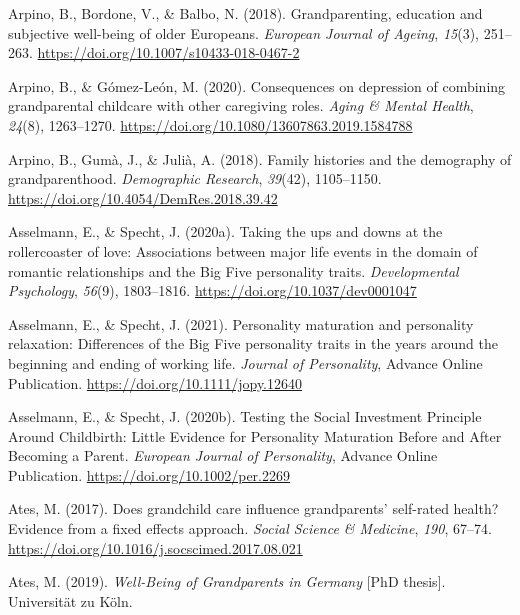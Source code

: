\documentclass[
  english,
  man,floatsintext]{apa7}
\begin{document}
\leavevmode\hypertarget{ref-arpinoGrandparentingEducationSubjective2018}{}%
Arpino, B., Bordone, V., \& Balbo, N. (2018). Grandparenting, education and subjective well-being of older Europeans. \emph{European Journal of Ageing}, \emph{15}(3), 251--263. \url{https://doi.org/10.1007/s10433-018-0467-2}

\leavevmode\hypertarget{ref-arpinoConsequencesDepressionCombining2020}{}%
Arpino, B., \& Gómez-León, M. (2020). Consequences on depression of combining grandparental childcare with other caregiving roles. \emph{Aging \& Mental Health}, \emph{24}(8), 1263--1270. \url{https://doi.org/10.1080/13607863.2019.1584788}

\leavevmode\hypertarget{ref-arpinoFamilyHistoriesDemography2018}{}%
Arpino, B., Gumà, J., \& Julià, A. (2018). Family histories and the demography of grandparenthood. \emph{Demographic Research}, \emph{39}(42), 1105--1150. \url{https://doi.org/10.4054/DemRes.2018.39.42}

\leavevmode\hypertarget{ref-asselmannTakingUpsDowns2020}{}%
Asselmann, E., \& Specht, J. (2020a). Taking the ups and downs at the rollercoaster of love: Associations between major life events in the domain of romantic relationships and the Big Five personality traits. \emph{Developmental Psychology}, \emph{56}(9), 1803--1816. \url{https://doi.org/10.1037/dev0001047}

\leavevmode\hypertarget{ref-asselmannPersonalityMaturationPersonality2021}{}%
Asselmann, E., \& Specht, J. (2021). Personality maturation and personality relaxation: Differences of the Big Five personality traits in the years around the beginning and ending of working life. \emph{Journal of Personality}, Advance Online Publication. \url{https://doi.org/10.1111/jopy.12640}

\leavevmode\hypertarget{ref-asselmannTestingSocialInvestment2020}{}%
Asselmann, E., \& Specht, J. (2020b). Testing the Social Investment Principle Around Childbirth: Little Evidence for Personality Maturation Before and After Becoming a Parent. \emph{European Journal of Personality}, Advance Online Publication. \url{https://doi.org/10.1002/per.2269}

\leavevmode\hypertarget{ref-atesDoesGrandchildCare2017}{}%
Ates, M. (2017). Does grandchild care influence grandparents' self-rated health? Evidence from a fixed effects approach. \emph{Social Science \& Medicine}, \emph{190}, 67--74. \url{https://doi.org/10.1016/j.socscimed.2017.08.021}

\leavevmode\hypertarget{ref-atesWellBeingGrandparentsGermany2019}{}%
Ates, M. (2019). \emph{Well-Being of Grandparents in Germany} {[}PhD thesis{]}. Universität zu Köln.
\end{document}
